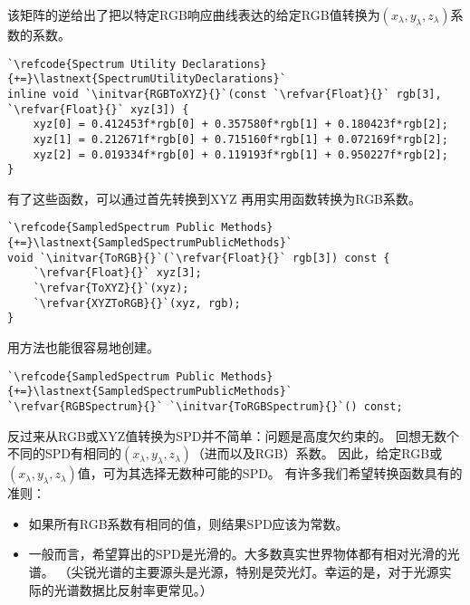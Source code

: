该矩阵的逆给出了把以特定RGB响应曲线表达的给定RGB值转换为$(x_{\lambda},y_{\lambda},z_{\lambda})$系数的系数。
\begin{lstlisting}
`\refcode{Spectrum Utility Declarations}{+=}\lastnext{SpectrumUtilityDeclarations}`
inline void `\initvar{RGBToXYZ}{}`(const `\refvar{Float}{}` rgb[3], `\refvar{Float}{}` xyz[3]) {
    xyz[0] = 0.412453f*rgb[0] + 0.357580f*rgb[1] + 0.180423f*rgb[2];
    xyz[1] = 0.212671f*rgb[0] + 0.715160f*rgb[1] + 0.072169f*rgb[2];
    xyz[2] = 0.019334f*rgb[0] + 0.119193f*rgb[1] + 0.950227f*rgb[2];
}
\end{lstlisting}

有了这些函数，可以通过首先转换到XYZ
再用实用函数转换为RGB系数。
\begin{lstlisting}
`\refcode{SampledSpectrum Public Methods}{+=}\lastnext{SampledSpectrumPublicMethods}`
void `\initvar{ToRGB}{}`(`\refvar{Float}{}` rgb[3]) const { 
    `\refvar{Float}{}` xyz[3];
    `\refvar{ToXYZ}{}`(xyz);
    `\refvar{XYZToRGB}{}`(xyz, rgb);
}
\end{lstlisting}

用方法也能很容易地创建。
\begin{lstlisting}
`\refcode{SampledSpectrum Public Methods}{+=}\lastnext{SampledSpectrumPublicMethods}`
`\refvar{RGBSpectrum}{}` `\initvar{ToRGBSpectrum}{}`() const;
\end{lstlisting}

反过来从RGB或XYZ值转换为SPD并不简单：问题是高度欠约束的。
回想无数个不同的SPD有相同的$(x_{\lambda},y_{\lambda},z_{\lambda})$（进而以及RGB）系数。
因此，给定RGB或$(x_{\lambda},y_{\lambda},z_{\lambda})$值，可为其选择无数种可能的SPD。
有许多我们希望转换函数具有的准则：
\begin{itemize}
    \item 如果所有RGB系数有相同的值，则结果SPD应该为常数。
    \item 一般而言，希望算出的SPD是光滑的。大多数真实世界物体都有相对光滑的光谱。
    （尖锐光谱的主要源头是光源，特别是荧光灯。幸运的是，对于光源实际的光谱数据比反射率更常见。）
\end{itemize}

